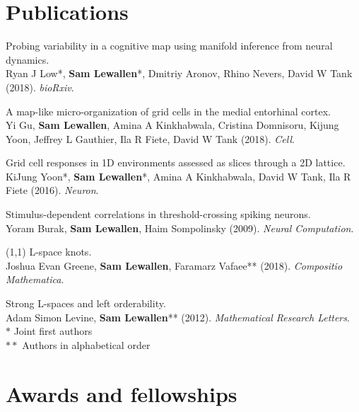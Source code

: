 \documentclass[letterpaper]{article}
\def\lsk{\\[.2em]}
\renewenvironment{itemize}{
  \begin{list}{}{
    \setlength{\leftmargin}{1.5em}
  }
}{
  \end{list}
}
\begin{document}
\section*{Publications}
\begin{itemize}

\item Probing variability in a cognitive map using manifold inference from
neural dynamics. \lsk
Ryan J Low*, \textbf{Sam Lewallen}*, Dmitriy Aronov, Rhino Nevers, David W Tank
(2018). \emph{bioRxiv}. \\

\item A map-like micro-organization of grid cells in the medial entorhinal
cortex. \lsk
Yi Gu, \textbf{Sam Lewallen}, Amina A Kinkhabwala, Cristina Domnisoru, Kijung Yoon, Jeffrey L Gauthier, Ila R Fiete, David W Tank (2018). \emph{Cell}. \\

\item Grid cell responses in 1D environments assessed as slices through a 2D
lattice. \lsk
KiJung Yoon*, \textbf{Sam Lewallen}*, Amina A Kinkhabwala, David W Tank, Ila R
Fiete (2016). \emph{Neuron}. \\

\item Stimulus-dependent correlations in threshold-crossing spiking neurons.  \lsk
Yoram Burak, \textbf{Sam Lewallen}, Haim Sompolinsky (2009). \emph{Neural
Computation}. \\

\item (1,1) L-space knots. \lsk
Joshua Evan Greene, \textbf{Sam Lewallen}, Faramarz Vafaee** (2018).
\emph{Compositio Mathematica}. \\

\item Strong L-spaces and left orderability. \lsk
Adam Simon Levine, \textbf{Sam Lewallen}** (2012). \emph{Mathematical Research
Letters}. \\

$*$ Joint first authors \lsk
$**$ Authors in alphabetical order

\end{itemize}

\section*{Awards and fellowships}
\end{document}
